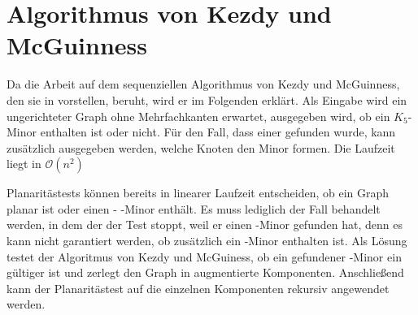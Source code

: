 \chapter{Algorithmus von Kezdy und McGuinness}
\label{cha:algorithmuskezdymcguinness}

Da die Arbeit auf dem sequenziellen Algorithmus von Kezdy und McGuinness, den sie in \cite{Kez92} vorstellen, beruht, wird er im Folgenden erklärt.
Als Eingabe wird ein ungerichteter Graph ohne Mehrfachkanten erwartet, ausgegeben wird, ob ein $K_5$-Minor enthalten ist oder nicht.
Für den Fall, dass einer gefunden wurde, kann zusätzlich ausgegeben werden, welche Knoten den Minor formen.
Die Laufzeit liegt in $\mathcal{O}(n^2)$

Planaritästests können bereits in linearer Laufzeit entscheiden, ob ein Graph planar ist oder einen \kf- \bzw \kdd-Minor enthält.
Es muss lediglich der Fall behandelt werden, in dem der der Test stoppt, weil er einen \kdd-Minor gefunden hat, denn es kann nicht garantiert werden, ob zusätzlich ein \kf-Minor enthalten ist.
Als Lösung testet der Algoritmus von Kezdy und McGuiness, ob ein gefundener \kdd-Minor ein gültiger \dseparator ist und zerlegt \ggf den Graph in augmentierte Komponenten.
Anschließend kann der Planaritästest auf die einzelnen Komponenten rekursiv angewendet werden.

